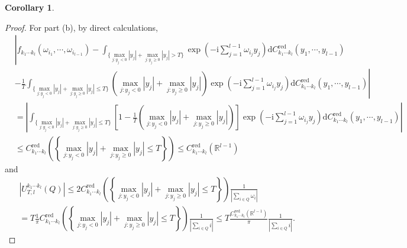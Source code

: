 \documentclass[11pt]{article}
\numberwithin{equation}{section}
\theoremstyle{plain}
\theoremstyle{definition}
\theoremstyle{definition}
\theoremstyle{assumption}
\theoremstyle{proposition}
\theoremstyle{proposition}
\newtheorem{corollary}{Corollary}[section]
\theoremstyle{example}
\theoremstyle{lemma}
\theoremstyle{theorem}
\theoremstyle{remark}
\begin{document}
\begin{corollary}
\begin{proof}
For part (b), by direct calculations,
\begin{align*}
&\left|f_{k_1\cdots k_l}(\omega_{i_1},\cdots,\omega_{i_{l-1}}) -\int_{\{\max_{j:y_j<0}|y_j| + \max_{j:y_j\geqslant0}|y_j|> T\}}\exp\left(-\mathrm{i}\sum_{j=1}^{l-1}\omega_{i_j} y_j\right) \mathrm{d}C_{k_1\cdots k_l}^{\mathrm{red}}(y_1, \cdots, y_{l-1})\right. \\
& -\left.\frac{1}{T}\int_{\{\max_{j:y_j<0}|y_j| + \max_{j:y_j\geqslant0}|y_j|\leqslant T\}}\left(\max_{j:y_j<0}|y_j| + \max_{j:y_j\geqslant0}|y_j|\right)\exp\left(-\mathrm{i}\sum_{j=1}^{l-1}\omega_{i_j} y_j\right) \mathrm{d}C_{k_1\cdots k_l}^{\mathrm{red}}(y_1, \cdots, y_{l-1}) \right| \\
&= \left|\int_{\{\max_{j:y_j<0}|y_j| + \max_{j:y_j\geqslant0}|y_j|\leqslant T\}} \left[ 1 - \frac{1}{T}\left( \max_{j:y_j<0}|y_j| + \max_{j:y_j\geqslant0}|y_j|\right)\right]\exp\left(-\mathrm{i}\sum_{j=1}^{l-1}\omega_{i_j} y_j\right) \mathrm{d}C_{k_1\cdots k_l}^{\mathrm{red}}(y_1, \cdots, y_{l-1}) \right| \\
&\leqslant C_{k_1\cdots k_l}^{\mathrm{red}}\left(\left\{\max_{j:y_j<0}|y_j| + \max_{j:y_j\geqslant0}|y_j|\leqslant T\right\}\right)
\leqslant C_{k_1\cdots k_l}^{\mathrm{red}}\left(\mathbb{R}^{l-1}\right)   
\end{align*}
and
\begin{align*}
&|U_{T,l}^{k_1\cdots k_l}\left(Q\right)|
\leqslant 2C_{k_1\cdots k_l}^{\mathrm{red}}\left(\left\{\max_{j:y_j<0}|y_j| + \max_{j:y_j\geqslant0}|y_j|\leqslant T\right\}\right) \frac{1}{|\sum_{i\in Q}\omega_i|} \\
&=T\frac{1}{\pi}C_{k_1\cdots k_l}^{\mathrm{red}}\left(\left\{\max_{j:y_j<0}|y_j| + \max_{j:y_j\geqslant0}|y_j|\leqslant T\right\}\right) \frac{1}{|\sum_{i\in Q}i|}
\leqslant T \frac{C_{k_1\cdots k_l}^{\mathrm{red}}\left(\mathbb{R}^{l-1}\right)}{\pi} \frac{1}{|\sum_{i\in Q}i|} .
\end{align*}
\end{proof}
\end{corollary}
\end{document}
